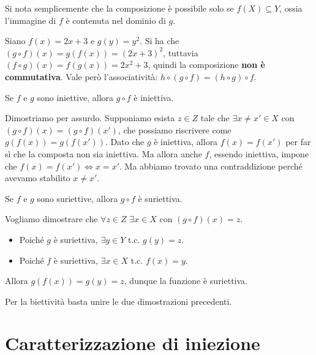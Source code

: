 \documentclass[12pt]{report}
\begin{document}
	Si nota semplicemente che la composizione è possibile solo se $f(X) \subseteq Y$, ossia l'immagine di $f$ è contenuta nel dominio di $g$.
	
	\begin{osservazione}{}{}
		Siano $f(x) = 2x + 3$ e $g(y) = y^2$. Si ha che $(g \circ f)(x) = g(f(x)) = (2x+3)^2$, tuttavia $(f \circ g)(x) = f(g(x)) = 2x^2 + 3$, quindi la composizione \textbf{non è commutativa}. Vale però l'associatività: $h \circ (g \circ f) = (h \circ g) \circ f$.
	\end{osservazione}
	
	\begin{proposizione}{}{}
		Se $f$ e $g$ sono iniettive, allora $g \circ f$ è iniettiva.
	\end{proposizione}
	\begin{dimostrazione}{}{}
		Dimostriamo per assurdo. Supponiamo esista $z \in Z$ tale che $\exists x \neq x' \in X$ con $(g \circ f)(x) = (g \circ f)(x')$, che possiamo riscrivere come $g(f(x)) = g(f(x'))$.
		Dato che $g$ è iniettiva, allora $f(x) = f(x')$ per far sì che la composta non sia iniettiva. Ma allora anche $f$, essendo iniettiva, impone che $f(x) = f(x') \iff x = x'$. Ma abbiamo trovato una contraddizione perché avevamo stabilito $x \neq x'$.
	\end{dimostrazione}
	
	\begin{proposizione}{}{}
		Se $f$ e $g$ sono suriettive, allora $g \circ f$ è suriettiva.
	\end{proposizione}
	\begin{dimostrazione}{}{}
		Vogliamo dimostrare che $\forall z \in Z \,\, \exists x \in X$ con $(g \circ f)(x) = z$.
		\begin{itemize}
			\item Poiché $g$ è suriettiva, $\exists y \in Y$ t.c. $g(y) = z$.
			\item Poiché $f$ è suriettiva, $\exists x \in X$ t.c. $f(x) = y$.
		\end{itemize}
		Allora $g(f(x)) = g(y) = z$, dunque la funzione è suriettiva.
	\end{dimostrazione}
	
	Per la biettività basta unire le due dimostrazioni precedenti.
	
	\section{Caratterizzazione di iniezione}
	
\end{document}
